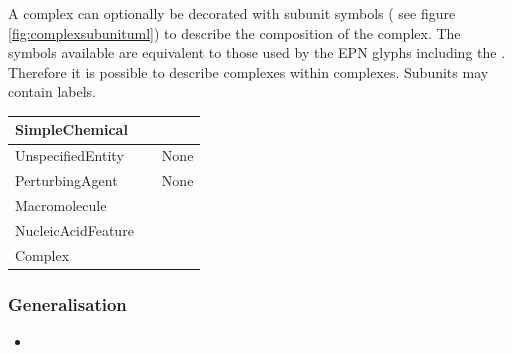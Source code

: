A complex can optionally be decorated with subunit symbols
( see figure \ref{fig:complexsubunituml}) to
describe the composition of the complex. The symbols available are
equivalent to those used by the EPN glyphs including the
. Therefore it is possible to describe complexes within
complexes. Subunits may contain labels. 

\begin{center}
\label{tab:subunit types}
\begin{footnotesize}
\tablelasttail{\hline}
\begin{supertabular}{|l|l|l|}\hline
SimpleChemical &   & \\\hline
UnspecifiedEntity &  & None\\\hline
PerturbingAgent &  & None\\\hline
Macromolecule &  &
\\\hline
Nucleic\-Acid\-Feature &  & \\\hline
Complex &  & \\\hline
\end{supertabular}
\end{footnotesize}
\end{center}
\subsubsection{Generalisation}

\begin{itemize}
\item {} 
\end{itemize}

